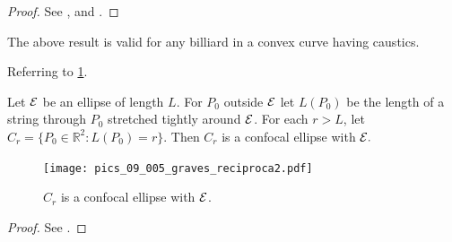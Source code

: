  \begin{proof}
 See \cite{chasles1843}, \cite[pp. 283-284]{darboux1917} and \cite[pp. 115-116]{carneiro2005}. 
 \end{proof}
 
  The  above result is valid for any billiard in a convex curve having caustics. 
 
Referring to \cref{fig:09-reciproca_graves}.
      
\begin{proposition}
   Let $\mathcal{E}$ be an ellipse of length $L$.
   For $P_0$  outside $\mathcal{E}$ let $L(P_0)$   be the length of a string through $P_0$ stretched tightly around $\mathcal{E}$. For each $r>L$, let $C_r=\{P_0\in\mathbb{R}^2: L(P_0)=r\}.$  Then $C_r$ is a confocal ellipse with $\mathcal{E}.$ 
\label{prop:09-caustic}
\end{proposition} 
      
\begin{figure}
\begin{center}
\texttt{[image: pics\_09\_005\_graves\_reciproca2.pdf]}
\caption{$C_r$ is a confocal  ellipse with $\mathcal{E}$.}
\end{center}
\label{fig:09-reciproca_graves}
\end{figure}

\begin{proof}
See \cite[page 14]{akopyan2007-conics}.
\end{proof}